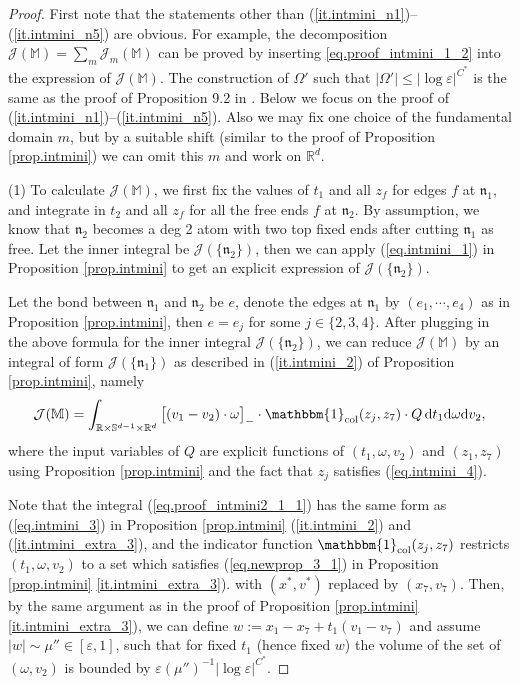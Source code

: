 \documentclass[10pt, reqno]{amsart}
\newcommand{\Mb}{\mathbb M}
\newcommand{\Rb}{\mathbb R}
\newcommand{\Sb}{\mathbb S}
\newcommand {\Jc}{\mathcal J}
\newcommand{\nf}{\mathfrak n}
\theoremstyle{definition}
\theoremstyle{remark}
\numberwithin{equation}{section}
\begin{document}
\begin{proof} First note that the statements other than (\ref{it.intmini_n1})--(\ref{it.intmini_n5}) are obvious. For example, the decomposition $\Jc(\Mb)=\sum_m \Jc_m(\Mb)$ can be proved by inserting \eqref{eq.proof_intmini_1_2} into the expression of $\Jc(\Mb)$. The construction of $\Omega'$ such that $|\Omega'|\leq |\log\varepsilon|^{C^*}$ is the same as the proof of Proposition 9.2 in \cite{DHM24}. Below we focus on the proof of (\ref{it.intmini_n1})--(\ref{it.intmini_n5}). Also we may fix one choice of the fundamental domain $m$, but by a suitable shift (similar to the proof of Proposition \ref{prop.intmini}) we can omit this $m$ and work on $\Rb^d$.

(1) To calculate $\Jc(\Mb)$, we first fix the values of $t_1$ and all $z_f$ for edges $f$ at $\nf_1$, and integrate in $t_2$ and all $z_f$ for all the free ends $f$ at $\nf_2$. By assumption, we know that $\nf_2$ becomes a deg 2 atom with two top fixed ends after cutting $\nf_1$ as free. Let the inner integral be $\Jc(\{\nf_2\})$, then we can apply (\ref{eq.intmini_1}) in Proposition \ref{prop.intmini} to get an explicit expression of $\Jc(\{\nf_2\})$.

Let the bond between $\nf_1$ and $\nf_2$ be $e$,  denote the edges at $\nf_1$ by $(e_1,\cdots,e_4)$ as in Proposition \ref{prop.intmini}, then $e=e_j$ for some $j\in\{2,3,4\}$. After plugging in the above formula for the inner integral $\Jc(\{\nf_2\})$, we can reduce $\Jc(\Mb)$ by an integral of form $\Jc(\{\nf_1\})$ as described in (\ref{it.intmini_2}) of Proposition \ref{prop.intmini}, namely
\begin{equation}\label{eq.proof_intmini2_1_1}
    \Jc(\Mb)=\int_{\Rb\times\Sb^{d-1}\times\Rb^d}\big[(v_1-v_2)\cdot\omega\big]_-\cdot \mathbbm{1}_{\mathrm{col}}(z_j,z_7)\cdot Q\,\mathrm{d}t_1\mathrm{d}\omega\mathrm{d}v_2,
\end{equation} 
where the input variables of $Q$ are explicit functions of $(t_1,\omega,v_2)$ and $(z_1,z_7)$ using Proposition \ref{prop.intmini} and the fact that $z_j$ satisfies (\ref{eq.intmini_4}).

Note that the integral (\ref{eq.proof_intmini2_1_1}) has the same form as (\ref{eq.intmini_3}) in Proposition \ref{prop.intmini} (\ref{it.intmini_2}) and (\ref{it.intmini_extra_3}), and the indicator function $\mathbbm{1}_{\mathrm{col}}(z_j,z_7)$ restricts $(t_1,\omega,v_2)$ to a set which satisfies (\ref{eq.newprop_3_1}) in Proposition \ref{prop.intmini} \ref{it.intmini_extra_3}). with $(x^*,v^*)$ replaced by $(x_7,v_7)$. Then, by the same argument as in the proof of Proposition \ref{prop.intmini} \ref{it.intmini_extra_3}), we can define $w:=x_1-x_7+t_1(v_1-v_7)$ and assume $|w|\sim\mu''\in[\varepsilon,1]$, such that for fixed $t_1$ (hence fixed $w$) the volume of the set of $(\omega,v_2)$ is bounded by $\varepsilon(\mu'')^{-1}|\log\varepsilon|^{C^*}$.


\end{proof}
\end{document}

